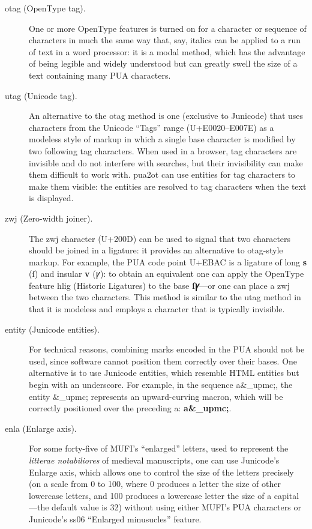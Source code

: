 \documentclass[12pt,letterpaper,openany]{article}
\newcommand\textSourceText[1]{{\color{GGOrange}\textsf{#1}}}
\newcommand\textex[1]{\textrm{\textbf{\color{BrickRed}#1}}}
\newcommand{\pto}{\textsf{\color{myLightPurple}pua2ot}}
\begin{document}
\begin{description}
  \item[otag (OpenType tag).] One or more OpenType features is turned on for a 
  character or sequence of characters in much the same way that, say, italics
  can be applied to a run of text in a word processor: it is a modal method,
  which has the advantage of being legible and widely understood but can greatly
  swell the size of a text containing many PUA characters.

  \item[utag (Unicode tag).] An alternative to the otag method is one (exclusive
  to Junicode) that uses characters from the Unicode “Tags” range (U+E0020–E007E)
  as a modeless style of markup in which a single base character is modified by 
  two following tag characters. When used in a browser, tag characters are 
  invisible and do not interfere with searches, but their invisibility can make 
  them difficult to work with. {\pto} can use entities for tag characters to 
  make them visible: the entities are resolved to tag characters when the text 
  is displayed.

  \item[zwj (Zero-width joiner).] The zwj character (U+200D) can be used to signal 
  that two characters should be joined in a ligature: it provides an alternative 
  to otag-style markup. For example, the PUA code point U+EBAC is a ligature of 
  long \textex{s} (ſ) and insular \textex{v} (ꝩ): to obtain an equivalent one can 
  apply the OpenType feature \textSourceText{hlig} (Historic Ligatures) to the 
  base \textex{ſꝩ}—or one can place a zwj between the two characters. This method 
  is similar to the utag method in that it is modeless and employs a character
  that is typically invisible.

  \item[entity (Junicode entities).] For technical reasons, combining marks 
  encoded in the PUA should not be used, since software cannot position them 
  correctly over their bases. One alternative is to use Junicode entities,
  which resemble HTML entities but begin with an underscore. For example, in the
  sequence \textSourceText{a\&\_upmc;}, the entity \textSourceText{\&\_upmc;}
  represents an upward-curving macron, which will be correctly positioned
  over the preceding a: \textex{a\&\_upmc;}.

  \item[enla (Enlarge axis).] For some forty-five of MUFI’s “enlarged” letters,
  used to represent the \textit{litterae notabiliores} of medieval manuscripts,
  one can use Junicode’s Enlarge axis, which allows one to control the size 
  of the letters precisely (on a scale from 0 to 100, where 0 produces a 
  letter the size of other lowercase letters, and 100 produces a lowercase 
  letter the size of a capital—the default value is 32) without using either 
  MUFI’s PUA characters or Junicode’s \textSourceText{ss06} “Enlarged minusucles”
  feature.
\end{description}
\end{document}
